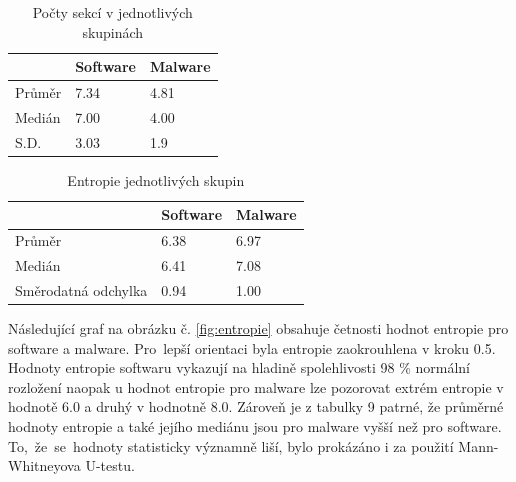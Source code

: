 \begin{table}[H]
    \caption{Počty sekcí v jednotlivých skupinách}
    \label{table:sections_table}
	
	\centering
	\begin{tabular}{|l|l|l|}
		\hline
		       & Software & Malware \\ 
		\hline
		\hline
		Průměr & 7.34     & 4.81    \\ \hline
		Medián & 7.00        & 4.00       \\ \hline
		S.D.   & 3.03     & 1.9    	\\ \hline
	\end{tabular}
\end{table}


\begin{table}[H]
    \caption{Entropie jednotlivých skupin}
    \label{table:entropie_table}
    
    \centering
	\begin{tabular}{|l|l|l|}
		\hline
		                    & Software & Malware \\
		\hline
		\hline
		Průměr              & 6.38     & 6.97                  \\ \hline
		Medián              & 6.41     & 7.08                  \\ \hline
		Směrodatná odchylka & 0.94     & 1.00                  \\ \hline
	\end{tabular}
\end{table}

Následující graf na obrázku č. \ref{fig:entropie} obsahuje četnosti hodnot entropie pro software a malware. Pro~lepší orientaci byla entropie zaokrouhlena v kroku 0.5. Hodnoty entropie softwaru vykazují na hladině spolehlivosti 98 \% normální rozložení naopak u hodnot entropie pro malware lze pozorovat extrém entropie v hodnotě 6.0 a druhý v hodnotně 8.0. Zároveň je z tabulky 9 patrné, že průměrné hodnoty entropie a také jejího mediánu jsou pro malware vyšší než pro software. To,~že~se~hodnoty statisticky významně liší, bylo prokázáno i za použití Mann-Whitneyova U-testu. 

